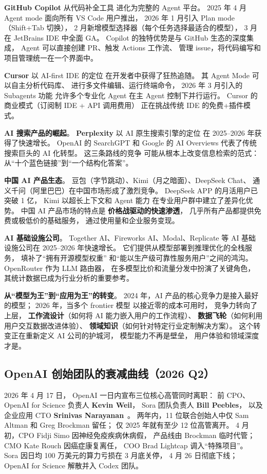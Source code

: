 \textbf{GitHub Copilot} 从代码补全工具
进化为完整的 Agent 平台。
2025 年 4 月 Agent mode 面向所有 VS Code 用户推出，
2026 年 1 月引入 Plan mode（Shift+Tab 切换），
2 月新增模型选择器（每个任务选择最适合的模型），
3 月在 JetBrains IDE 中全面 GA。
Copilot 的独特优势是与 GitHub 生态的深度集成，
Agent 可以直接创建 PR、触发 Actions 工作流、
管理 issue，将代码编写和项目管理统一在一个界面中。

\textbf{Cursor} 以 AI-first IDE 的定位
在开发者中获得了狂热追随。
其 Agent Mode 可以自主分析代码库、
进行多文件编辑、运行终端命令，
2026 年 3 月引入的 Subagents 功能
允许多个专业化 Agent 在主 Agent 控制下并行运行。
Cursor 的商业模式（订阅制 IDE + API 调用费用）
正在挑战传统 IDE 的免费+插件模式。

\textbf{AI 搜索产品的崛起}。
\textbf{Perplexity} 以 AI 原生搜索引擎的定位
在 2025--2026 年获得了快速增长。
OpenAI 的 SearchGPT 和 Google 的 AI Overviews
代表了传统搜索巨头的 AI 化转型。
这三条路线的竞争
可能从根本上改变信息检索的范式：
从“十个蓝色链接”到“一个结构化答案”。

\textbf{中国 AI 产品生态}。
豆包（字节跳动）、Kimi（月之暗面）、DeepSeek Chat、
通义千问（阿里巴巴）在中国市场形成了激烈竞争。
DeepSeek APP 的月活用户已突破 1 亿，
Kimi 以超长上下文和 Agent 能力
在专业用户群中建立了差异化优势。
中国 AI 产品市场的特点是
\textbf{价格战驱动的快速渗透}，
几乎所有产品都提供免费或极低价的基础服务，
通过使用量和企业服务变现。

\textbf{AI 基础设施公司}。
Together AI、Fireworks AI、Modal、Replicate 等
AI 基础设施公司在 2025--2026 年快速增长。
它们提供从模型部署到推理优化的全栈服务，
填补了“拥有开源模型权重”
和“能以生产级可靠性服务用户”之间的鸿沟。
OpenRouter 作为 LLM 路由器，
在多模型比价和流量分发中扮演了关键角色，
其统计数据已成为行业分析的重要参考。

\textbf{从“模型为王”到“应用为王”的转变}。
2024 年，AI 产品的核心竞争力是接入最好的模型；
2026 年，当多个 frontier 模型
以接近零的成本可用时，
竞争力转向了上层，
\textbf{工作流设计}（如何将 AI 能力嵌入用户的工作流程）、
\textbf{数据飞轮}（如何利用用户交互数据改进体验）、
\textbf{领域知识}（如何针对特定行业定制解决方案）。
这个转变正在重新定义 AI 公司的护城河，
模型能力不再是壁垒，
用户体验和领域深度才是。

\subsection{OpenAI 创始团队的衰减曲线（2026 Q2）}

2026 年 4 月 17 日，
OpenAI 一日内宣布三位核心高管同时离职：
前 CPO、OpenAI for Science 负责人 \textbf{Kevin Weil}，
Sora 团队负责人 \textbf{Bill Peebles}，
以及企业应用 CTO \textbf{Srinivas Narayanan}~\cite{openai_three_exits_2026}。
两年内，11 位联合创始人中仅 Sam Altman 和 Greg Brockman 留任；
仅 2025 年就有至少 12 位高管离开。
4 月初，CPO Fidji Simo 因神经免疫疾病休病假，
产品线由 Brockman 临时代管；
CMO Kate Rouch 因癌症康复离任，
COO Brad Lightcap 调入“特殊项目”。
Sora 因日均 100 万美元的算力亏损在 3 月底关停，
4 月 26 日彻底下线；
OpenAI for Science 解散并入 Codex 团队。

